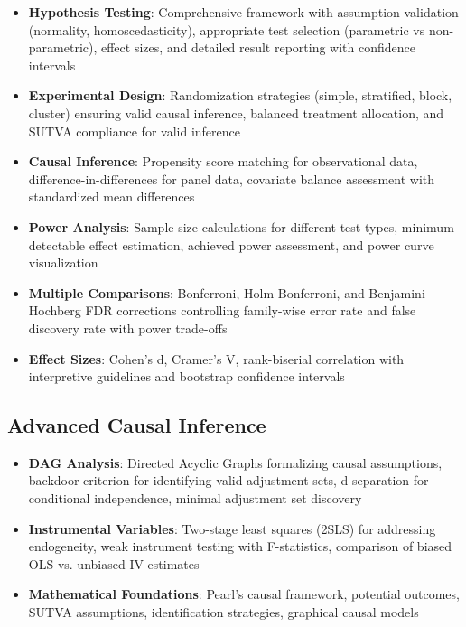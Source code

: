 \begin{itemize}
    \item \textbf{Hypothesis Testing}: Comprehensive framework with assumption validation (normality, homoscedasticity), appropriate test selection (parametric vs non-parametric), effect sizes, and detailed result reporting with confidence intervals

    \item \textbf{Experimental Design}: Randomization strategies (simple, stratified, block, cluster) ensuring valid causal inference, balanced treatment allocation, and SUTVA compliance for valid inference

    \item \textbf{Causal Inference}: Propensity score matching for observational data, difference-in-differences for panel data, covariate balance assessment with standardized mean differences

    \item \textbf{Power Analysis}: Sample size calculations for different test types, minimum detectable effect estimation, achieved power assessment, and power curve visualization

    \item \textbf{Multiple Comparisons}: Bonferroni, Holm-Bonferroni, and Benjamini-Hochberg FDR corrections controlling family-wise error rate and false discovery rate with power trade-offs

    \item \textbf{Effect Sizes}: Cohen's d, Cramer's V, rank-biserial correlation with interpretive guidelines and bootstrap confidence intervals
\end{itemize}

\subsection{Advanced Causal Inference}

\begin{itemize}
    \item \textbf{DAG Analysis}: Directed Acyclic Graphs formalizing causal assumptions, backdoor criterion for identifying valid adjustment sets, d-separation for conditional independence, minimal adjustment set discovery

    \item \textbf{Instrumental Variables}: Two-stage least squares (2SLS) for addressing endogeneity, weak instrument testing with F-statistics, comparison of biased OLS vs. unbiased IV estimates

    \item \textbf{Mathematical Foundations}: Pearl's causal framework, potential outcomes, SUTVA assumptions, identification strategies, graphical causal models
\end{itemize}

